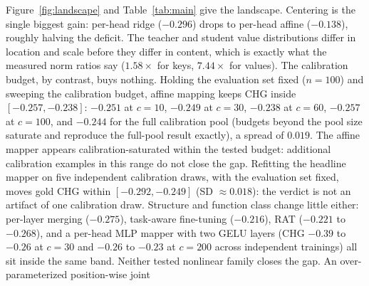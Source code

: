 \documentclass{article} %
\begin{document}
Figure~\ref{fig:landscape} and Table~\ref{tab:main} give the landscape.
Centering is the single biggest gain: per-head ridge ($-0.296$) drops to
per-head affine ($-0.138$), roughly halving the deficit. The teacher and
student value distributions differ in location and scale before they differ
in content, which is exactly what the measured norm ratios say ($1.58\times$
for keys, $7.44\times$ for values). The calibration budget, by contrast,
buys nothing. Holding the evaluation set fixed ($n{=}100$) and sweeping the
calibration budget, affine mapping keeps CHG
inside $[-0.257, -0.238]$: $-0.251$ at $c{=}10$, $-0.249$ at $c{=}30$,
$-0.238$ at $c{=}60$, $-0.257$ at $c{=}100$, and $-0.244$ for the full
calibration pool (budgets beyond the pool size saturate and reproduce the
full-pool result exactly), a spread of $0.019$. The affine mapper appears
calibration-saturated within the tested budget: additional calibration examples
in this range do not close the gap. Refitting the headline
mapper on five independent calibration draws, with the evaluation set fixed,
moves gold CHG within $[-0.292, -0.249]$ (SD $\approx 0.018$): the verdict
is not an artifact of one calibration draw. Structure and function
class change little either: per-layer merging ($-0.275$), task-aware
fine-tuning ($-0.216$), RAT ($-0.221$ to $-0.268$), and a per-head MLP mapper
with two GELU layers (CHG $-0.39$ to $-0.26$ at $c{=}30$ and $-0.26$ to
$-0.23$ at $c{=}200$ across independent trainings) all sit inside the same
band. Neither tested nonlinear family closes the gap. An over-parameterized
position-wise joint
\end{document}
